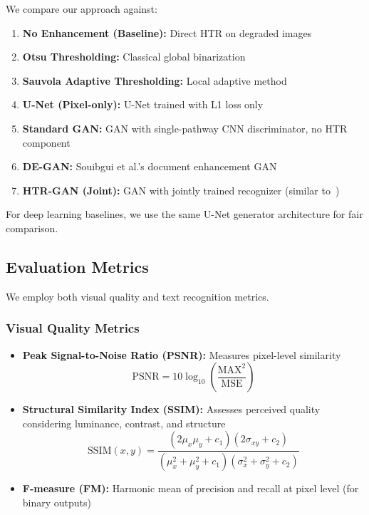 \documentclass[journal]{IEEEtran}
\begin{document}
We compare our approach against:

\begin{enumerate}
    \item \textbf{No Enhancement (Baseline):} Direct HTR on degraded images
    \item \textbf{Otsu Thresholding:} Classical global binarization
    \item \textbf{Sauvola Adaptive Thresholding:} Local adaptive method
    \item \textbf{U-Net (Pixel-only):} U-Net trained with L1 loss only
    \item \textbf{Standard GAN:} GAN with single-pathway CNN discriminator, no HTR component
    \item \textbf{DE-GAN:} Souibgui et al.'s document enhancement GAN~\cite{souibgui2020degan}
    \item \textbf{HTR-GAN (Joint):} GAN with jointly trained recognizer (similar to~\cite{souibgui2021enhance})
\end{enumerate}

For deep learning baselines, we use the same U-Net generator architecture for fair comparison.

\subsection{Evaluation Metrics}

We employ both visual quality and text recognition metrics.

\subsubsection{Visual Quality Metrics}

\begin{itemize}
    \item \textbf{Peak Signal-to-Noise Ratio (PSNR):} Measures pixel-level similarity
    \begin{equation}
    \text{PSNR} = 10 \log_{10}\left(\frac{\text{MAX}^2}{\text{MSE}}\right)
    \end{equation}
    
    \item \textbf{Structural Similarity Index (SSIM):} Assesses perceived quality considering luminance, contrast, and structure~\cite{wang2004ssim}
    \begin{equation}
    \text{SSIM}(x,y) = \frac{(2\mu_x\mu_y + c_1)(2\sigma_{xy} + c_2)}{(\mu_x^2 + \mu_y^2 + c_1)(\sigma_x^2 + \sigma_y^2 + c_2)}
    \end{equation}
    
    \item \textbf{F-measure (FM):} Harmonic mean of precision and recall at pixel level (for binary outputs)
\end{itemize}
\end{document}
